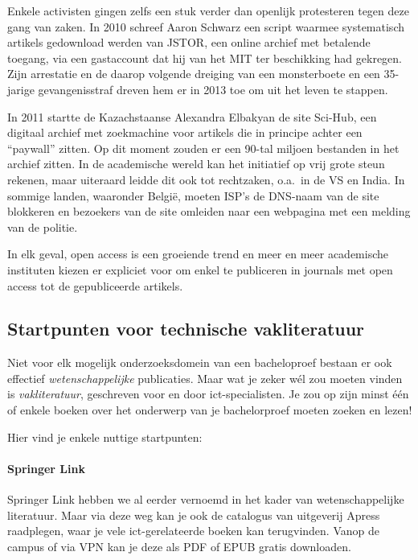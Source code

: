 Enkele activisten gingen zelfs een stuk verder dan openlijk protesteren tegen deze gang van zaken. In 2010 schreef Aaron Schwarz een script waarmee systematisch artikels gedownload werden van JSTOR, een online archief met betalende toegang, via een gastaccount dat hij van het MIT ter beschikking had gekregen. Zijn arrestatie en de daarop volgende dreiging van een monsterboete en een 35-jarige gevangenisstraf dreven hem er in 2013 toe om uit het leven te stappen.

In 2011 startte de Kazachstaanse Alexandra Elbakyan de site Sci-Hub, een digitaal archief met zoekmachine voor artikels die in principe achter een ``paywall'' zitten. Op dit moment zouden er een 90-tal miljoen bestanden in het archief zitten. In de academische wereld kan het initiatief op vrij grote steun rekenen, maar uiteraard leidde dit ook tot rechtzaken, o.a.\ in de VS en India. In sommige landen, waaronder België, moeten ISP's de DNS-naam van de site blokkeren en bezoekers van de site omleiden naar een webpagina met een melding van de politie.

In elk geval, open access is een groeiende trend en meer en meer academische instituten kiezen er expliciet voor om enkel te publiceren in journals met open access tot de gepubliceerde artikels.

\subsection{Startpunten voor technische vakliteratuur}%
\label{ssec:technische-vakliteratuur}

Niet voor elk mogelijk onderzoeksdomein van een bacheloproef bestaan er ook effectief \textit{wetenschappelijke} publicaties. Maar wat je zeker wél zou moeten vinden is \textit{vakliteratuur}, geschreven voor en door ict-specialisten. Je zou op zijn minst één of enkele boeken over het onderwerp van je bachelorproef moeten zoeken en lezen!

Hier vind je enkele nuttige startpunten:

\paragraph{Springer Link}

Springer Link hebben we al eerder vernoemd in het kader van wetenschappelijke literatuur. Maar via deze weg kan je ook de catalogus van uitgeverij Apress raadplegen, waar je vele ict-gerelateerde boeken kan terugvinden. Vanop de campus of via VPN kan je deze als PDF of EPUB gratis downloaden.

